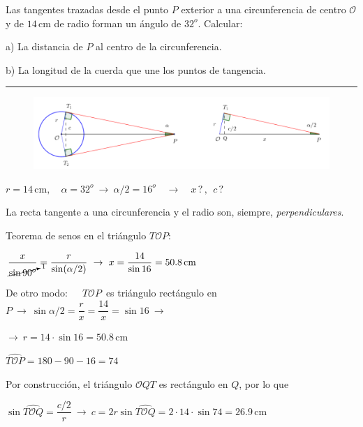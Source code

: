 \begin{miejercicio}

Las tangentes trazadas desde el punto $P$ exterior a una circunferencia de centro $\mathcal O$ y de $14 \, \mathrm{cm}$ de radio forman un ángulo de $32^o$. Calcular:

a) La distancia de $P$ al centro de la circunferencia.

b) La longitud de la cuerda que une los puntos de tangencia.

\rule{250pt}{0.1pt}

\begin{figure}[H]
	\centering
	\includegraphics[width=1\textwidth]{img-triang/triang22.png}
\end{figure}

$r=14\, \mathrm{cm},\quad \alpha=32^o \ \to \ \alpha/2=16^o \quad \to \quad x\, ?\, , \ \ c\, ?$

\vspace{2mm} La recta tangente a una circunferencia y el radio son, siempre, \emph{perpendiculares}.

\vspace{2mm} Teorema de senos en el triángulo $T\mathcal O P$:

\vspace{2mm} $\dfrac{x}{\cancelto{1}{\sin 90^o}}=\dfrac{r}{\sin(\alpha/2)} \ \to \ x=\dfrac{14}{\sin 16}=50.8\, \mathrm{cm}$

\vspace{2mm} \textcolor{gris}{De otro modo:\ $\quad T\mathcal OP \, $ es triángulo rectángulo en $P \ \to \ \sin \alpha/2 = \dfrac{r}{x}=\dfrac{14}{x}=\sin 16 \ \to $}

\vspace{2mm} \textcolor{gris}{$\to \ r=14\cdot \sin 16=50.8\, \mathrm{cm}$}

\vspace{2mm} $\widehat{T\mathcal O P}=180-90-16=74$

\vspace{2mm} Por construcción, el triángulo $\mathcal O QT$ es rectángulo en $Q$, por lo que

\vspace{2mm} $\sin \widehat{T\mathcal O Q}=\dfrac{c/2}{r} \ \to \ c=2r\sin \widehat{T\mathcal O Q}=2\cdot 14\cdot \sin 74=26.9\, \mathrm{cm} $ 

\vspace{2mm}

\vspace{2mm}
\end{miejercicio}

